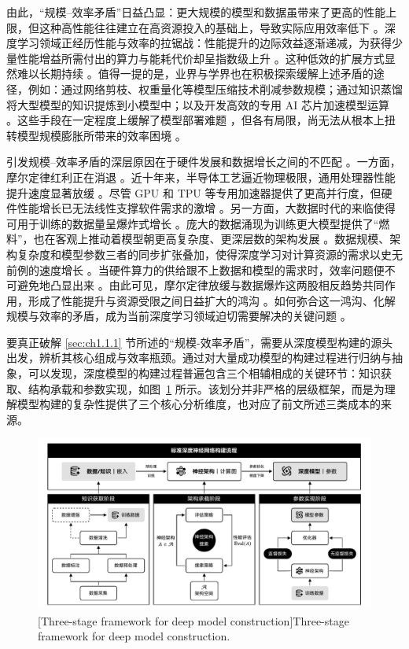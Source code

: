 \documentclass[../main.tex]{subfiles}
\begin{document}
由此，“规模–效率矛盾”日益凸显：更大规模的模型和数据虽带来了更高的性能上限，但这种高性能往往建立在高资源投入的基础上，导致实际应用效率低下 。深度学习领域正经历性能与效率的拉锯战：性能提升的边际效益逐渐递减，为获得少量性能增益所需付出的算力与能耗代价却呈指数级上升 。这种低效的扩展方式显然难以长期持续 。值得一提的是，业界与学界也在积极探索缓解上述矛盾的途径，例如：通过网络剪枝、权重量化等模型压缩技术削减参数规模；通过知识蒸馏将大型模型的知识提炼到小模型中；以及开发高效的专用 AI 芯片加速模型运算 。这些手段在一定程度上缓解了模型部署难题 ，但各有局限，尚无法从根本上扭转模型规模膨胀所带来的效率困境 。

引发规模–效率矛盾的深层原因在于硬件发展和数据增长之间的不匹配 。一方面，摩尔定律红利正在消退 。近十年来，半导体工艺逼近物理极限，通用处理器性能提升速度显著放缓 。尽管 GPU 和 TPU 等专用加速器提供了更高并行度，但硬件性能增长已无法线性支撑软件需求的激增 。另一方面，大数据时代的来临使得可用于训练的数据量呈爆炸式增长 。庞大的数据涌现为训练更大模型提供了“燃料”，也在客观上推动着模型朝更高复杂度、更深层数的架构发展 。数据规模、架构复杂度和模型参数三者的同步扩张叠加，使得深度学习对计算资源的需求以史无前例的速度增长 。当硬件算力的供给跟不上数据和模型的需求时，效率问题便不可避免地凸显出来 。由此可见，摩尔定律放缓与数据爆炸这两股相反趋势共同作用，形成了性能提升与资源受限之间日益扩大的鸿沟 。如何弥合这一鸿沟、化解规模与效率的矛盾，成为当前深度学习领域迫切需要解决的关键问题 。

\label{sec:Ch1-deep-model-construction-machanisam}

要真正破解 \ref{sec:ch1.1.1} 节所述的“规模-效率矛盾”，需要从深度模型构建的源头出发，辨析其核心组成与效率瓶颈。通过对大量成功模型的构建过程进行归纳与抽象，可以发现，深度模型的构建过程普遍包含三个相辅相成的关键环节：知识获取、结构承载和参数实现，如图~\ref{fig:three_stage_of_training} 所示。该划分并非严格的层级框架，而是为理解模型构建的复杂性提供了三个核心分析维度，也对应了前文所述三类成本的来源。

\begin{figure}
	\centering
	\includegraphics[width=\textwidth]{Ch1-1_three_stage_of_training.pdf}
	[Three-stage framework for deep model construction]{Three-stage framework for deep model construction.}
	\label{fig:three_stage_of_training}
\end{figure}
\end{document}
